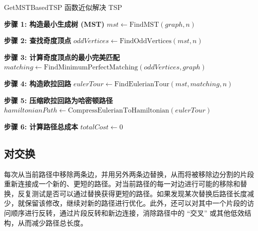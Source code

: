     \begin{algorithm}[htbp]
        \SetAlgoLined
        \caption{GetMSTBasedTSP 函数近似解决 TSP}
        \label{alg:mstbasedtsp}
        \BlankLine
        
        \textbf{步骤 1: 构造最小生成树 (MST)}\;
        $mst \leftarrow \text{FindMST}(graph, n)$\;
        
        \textbf{步骤 2: 查找奇度顶点}\;
        $oddVertices \leftarrow \text{FindOddVertices}(mst, n)$\;
        
        \textbf{步骤 3: 计算奇度顶点的最小完美匹配}\;
        $matching \leftarrow \text{FindMinimumPerfectMatching}(oddVertices, graph)$\;
        
        \textbf{步骤 4: 构造欧拉回路}\;
        $eulerTour \leftarrow \text{FindEulerianTour}(mst, matching, n)$\;
        
        \textbf{步骤 5: 压缩欧拉回路为哈密顿路径}\;
        $hamiltonianPath \leftarrow \text{CompressEulerianToHamiltonian}(eulerTour)$\;
        
        
        \textbf{步骤 6: 计算路径总成本}\;
        $totalCost \leftarrow 0$\;
        
        \;
        
        \end{algorithm}

\subsection{对交换}

每次从当前路径中移除两条边，并用另外两条边替换，从而将被移除边分割的片段重新连接成一个新的、更短的路径。对当前路径的每一对边进行可能的移除和替换，反复测试是否可以通过替换获得更短的路径。如果发现某次替换后路径长度减少，就保留该修改，继续对新的路径进行优化。此外，还可以对其中一个片段的访问顺序进行反转，通过片段反转和新边连接，消除路径中的 ``交叉'' 或其他低效结构，从而减少路径总长度。

